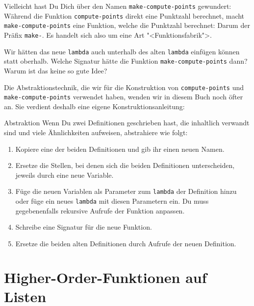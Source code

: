 Vielleicht hast Du Dich über den Namen \lstinline{make-compute-points}
gewundert: Während die Funktion \lstinline{compute-points} direkt eine Punktzahl
berechnet, macht \lstinline{make-compute-points} eine Funktion, welche
die Punktzahl berechnet: Darum der Präfix \lstinline{make-}.  Es
handelt sich also um eine Art "<Funktionsfabrik">.

\begin{aufgabeinline}
  Wir hätten das neue \lstinline{lambda} auch unterhalb des alten
  \lstinline{lambda} einfügen können statt oberhalb.  Welche Signatur
  hätte die Funktion \lstinline{make-compute-points} dann?  Warum ist
  das keine so gute Idee?
\end{aufgabeinline}

Die Abstraktionstechnik, die wir für die Konstruktion von
\lstinline{compute-points} und \lstinline{make-compute-points}
verwendet haben, wenden wir in diesem Buch noch öfter an.  Sie
verdient deshalb eine eigene Konstruktionsanleitung:

\begin{konstruktionsanleitung}{Abstraktion}
  \label{ka:abstraktion}
  Wenn Du zwei Definitionen geschrieben hast, die inhaltlich verwandt
  sind und viele Ähnlichkeiten aufweisen, abstrahiere wie folgt:
  \begin{enumerate}
  \item Kopiere eine der beiden Definitionen und gib ihr einen neuen
    Namen.
  \item Ersetze die Stellen, bei denen sich die beiden Definitionen
    unterscheiden, jeweils durch eine neue Variable.
  \item Füge die neuen Variablen als Parameter zum \lstinline{lambda}
    der Definition hinzu oder füge ein neues \lstinline{lambda} mit
    diesen Parametern ein.  Du muss gegebenenfalls rekursive Aufrufe
    der Funktion anpassen.
  \item Schreibe eine Signatur für die neue Funktion.
  \item Ersetze die beiden alten Definitionen durch Aufrufe der neuen
    Definition.
  \end{enumerate}
\end{konstruktionsanleitung}

\section{Higher-Order-Funktionen auf Listen}


